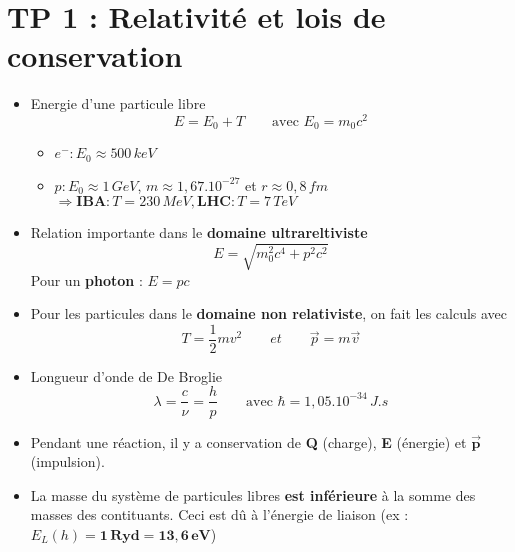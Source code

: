 \section*{TP 1 : Relativité et lois de conservation}

\begin{itemize}
	\item Energie d'une particule libre 
		\begin{equation}
			E = E_0 + T \qquad \mbox{avec } E_0 = m_0 c^2
		\end{equation}
		\begin{itemize}
			\item $e^- : E_0 \approx 500 \, keV$
			\item $p : E_0 \approx 1\, GeV$, $m \approx 1,67 .10^{-27}$ et $r \approx 0,8 \, fm$ \\
				 $\Rightarrow \mathbf{IBA} : T = 230 \, MeV, \mathbf{LHC} : T = 7 \, TeV$
		\end{itemize}
		
	\item Relation importante dans le \textbf{domaine ultrareltiviste}
		\begin{equation}
			E = \sqrt{m_0^2c^4 + p^2c^2}
		\end{equation}
		Pour un \textbf{photon} : $E = pc$
	
	\item Pour les particules dans le \textbf{domaine non relativiste}, on fait les calculs avec
		\begin{equation}
			T = \frac{1}{2}mv^2 \qquad et \qquad \vec{p} = m \vec{v}
		\end{equation}
		
	\item Longueur d'onde de De Broglie 
		\begin{equation}
			\lambda = \frac{c}{\nu} = \frac{h}{p} \qquad \mbox{avec } \hbar = 1,05 . 10^{-34}\, J.s
		\end{equation}
	\item Pendant une réaction, il y a conservation de \textbf{Q} (charge), \textbf{E} (énergie) et $\vec{\mathbf{p}}$ (impulsion).
	
	\item La masse du système de particules libres \textbf{est inférieure} à la somme des masses des contituants. Ceci est dû à l'énergie de liaison (ex : $E_L(h) = \mathbf{1 \, Ryd = 13,6 \, eV}$)
\end{itemize}